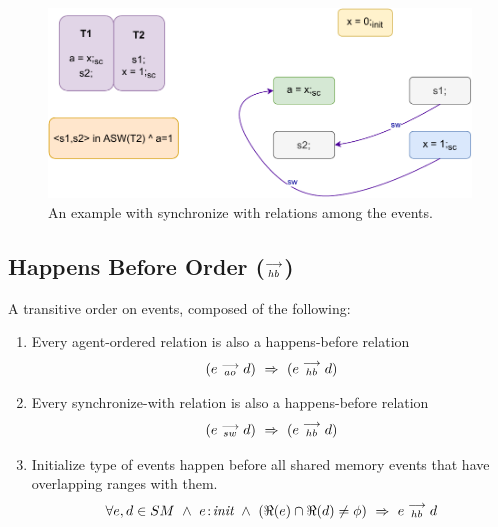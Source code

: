         \begin{figure}[H]
            \centering
            \includegraphics[scale=0.7]{ECMAScriptMemoryModel/SynchronizeWith.pdf}
            \caption{An example with synchronize with relations among the events.}
        \end{figure}

        
    \subsection{Happens Before Order ($\stackrel{\longrightarrow}{_{hb}}$)}
        A transitive order on events, composed of the following:
        
        \begin{enumerate}
            \item Every agent-ordered relation is also a happens-before relation 
                \begin{align*}
                    (\reln{e}{ao}{d}) \ \Rightarrow{} \ (\reln{e}{hb}{d})    
                \end{align*}
                
            \item Every synchronize-with relation is also a happens-before relation 
                \begin{align*}
                    (\reln{e}{sw}{d}) \ \Rightarrow{} \ (\reln{e}{hb}{d})    
                \end{align*}
                 
            \item Initialize type of events happen before all shared memory events that have overlapping ranges with them. 
                \begin{align*}
                    \forall e,d \in SM \ \wedge \ 
                    \et{e}{init} \ \wedge \ 
                    (\Re(e) \cap \Re(d) \neq \phi)
                    \ \Rightarrow{} \ 
                    \reln{e}{hb}{d}
                \end{align*}          
        \end{enumerate}
    
